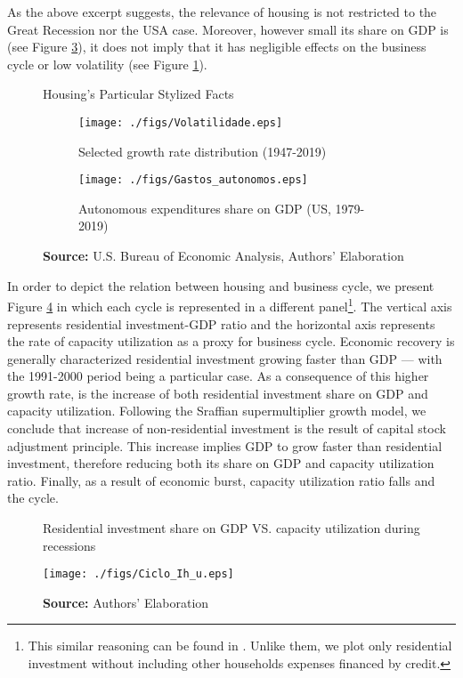 \documentclass[11pt]{article}
\begin{document}
As the above excerpt suggests, the relevance of housing is not restricted to the Great Recession nor the USA case.
Moreover, however small its share on GDP is (see Figure \ref{FigAutonomos}), it does not imply that it has negligible effects on the business cycle or low volatility (see Figure \ref{FigVolatilidade}).

\begin{figure}[H]
	\caption{Housing's Particular Stylized Facts}
	\label{fig:figs}
	\begin{subfigure}[t]{.45\textwidth}
		\centering
		\caption{Selected growth rate distribution (1947-2019)}
		\label{FigVolatilidade}
		\texttt{[image: ./figs/Volatilidade.eps]}
	\end{subfigure}
	\begin{subfigure}[t]{.45\textwidth}
		\centering
		\caption{Autonomous expenditures share on GDP (US, 1979-2019)}
		\label{FigAutonomos}
		\texttt{[image: ./figs/Gastos\_autonomos.eps]}  
	\end{subfigure}
	\caption*{\textbf{Source:} U.S. Bureau of Economic Analysis, Authors' Elaboration}
\end{figure}



In order to depict the relation between housing and business cycle, we present Figure \ref{FigIh_u}  in which each cycle is represented in a different panel\footnote{This similar reasoning can be found in \textcites{fiebiger_trend_2017}. Unlike them, we plot only residential investment without including other households expenses financed by credit.}. 
The vertical axis represents residential investment-GDP ratio and the horizontal
axis represents the rate of capacity utilization as a proxy for business cycle.
Economic recovery is generally characterized residential investment growing faster than GDP --- with the 1991-2000 period being a particular case. 
As a consequence of this higher growth rate, is the increase of both residential investment share on GDP and capacity utilization. 
Following the Sraffian supermultiplier growth model, we conclude that increase of non-residential investment is the result of capital stock adjustment principle.
This increase implies GDP to grow faster than residential investment, therefore reducing both its share on GDP and capacity utilization ratio. 
Finally, as a result of economic burst, capacity utilization ratio falls and the cycle.

\begin{figure}[H]
	\centering
	\caption{Residential investment share on GDP VS. capacity utilization during recessions}
	\label{FigIh_u}
	\texttt{[image: ./figs/Ciclo\_Ih\_u.eps]}
	\caption*{\textbf{Source:} Authors' Elaboration}
\end{figure}
\end{document}
